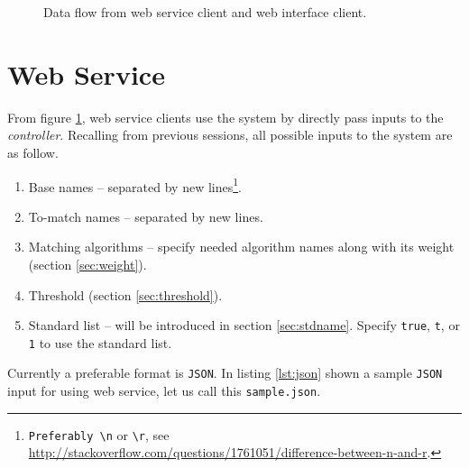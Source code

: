 \begin{figure}[H]
\centering
\captionsetup{justification=centering}
\caption{Data flow from web service client and web interface client.}
\label{fig:mvc}
\end{figure}

\section{Web Service}
\label{sec:ws}

From figure \ref{fig:mvc}, web service clients use the system
by directly pass inputs to the \emph{controller}. Recalling
from previous sessions, all possible inputs to the system
are as follow.

\begin{enumerate}
  \item Base names -- separated by
        new lines\footnote{\texttt{Preferably \textbackslash n} or \texttt{\textbackslash r}, see \url{http://stackoverflow.com/questions/1761051/difference-between-n-and-r}.}.
  \item To-match names -- separated by new lines.
  \item Matching algorithms -- specify needed algorithm names along with its weight (section \ref{sec:weight}).
  \item Threshold (section \ref{sec:threshold}).
  \item Standard list -- will be introduced in section \ref{sec:stdname}.
    Specify \texttt{true}, \texttt{t}, or \texttt{1} to use the standard list.
\end{enumerate}

Currently a preferable format is \texttt{JSON}. In listing \ref{lst:json}
shown a sample \texttt{JSON} input for using web service, let us
call this \texttt{sample.json}.

